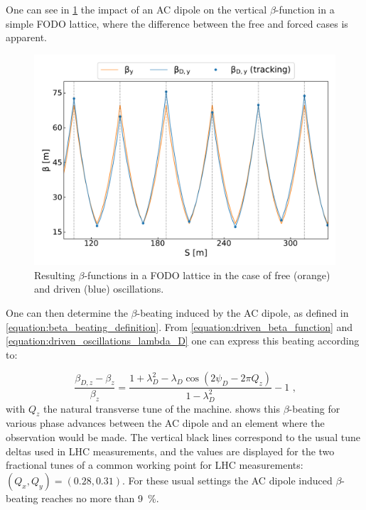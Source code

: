 One can see in \cref{figure:acdipole_beta_functions_vs_nominal} the impact of an AC dipole on the vertical \(\beta\)-function in a simple FODO lattice, where the difference between the free and forced cases is apparent.

\begin{figure}[!htb]
  \centering
  \includegraphics*[width=0.99\linewidth]{Figures/Optics_Measurements_Corrections_at_LHC/betas_nominal_vs_driven.pdf}
  \caption{Resulting \(\beta\)-functions in a FODO lattice in the case of free (\textcolor{mplorange}{orange}) and driven (\textcolor{mplblue}{blue}) oscillations.}
  \label{figure:acdipole_beta_functions_vs_nominal}
\end{figure}

One can then determine the \(\beta\)-beating induced by the AC dipole, as defined in \cref{equation:beta_beating_definition}.
From \cref{equation:driven_beta_function} and \cref{equation:driven_oscillations_lambda_D} one can express this beating according to:

\begin{equation}
  \frac{\beta_{D,z} - \beta_z}{\beta_z} = \frac{1 + \lambda_D^2 - \lambda_D \cos \left(2 \psi_D - 2 \pi Q_z\right)}{1 - \lambda_D^2} - 1 \text{ ,}
  \label{equation:ac_dipole_beta_beating}
\end{equation}
with \(Q_z\) the natural transverse tune of the machine.
 shows this \(\beta\)-beating for various phase advances between the AC dipole and an element where the observation would be made.
The vertical black lines correspond to the usual tune deltas used in LHC measurements, and the values are displayed for the two fractional tunes of a common working point for LHC measurements: \((Q_x, Q_y) = (0.28, 0.31)\).
For these usual settings the AC dipole induced \(\beta\)-beating reaches no more than \qty{9}{\percent}.

